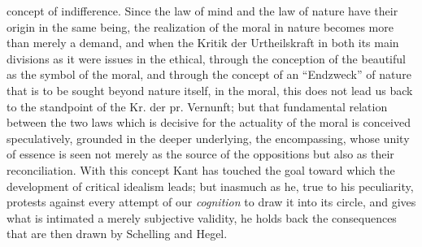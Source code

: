 concept of indifference. Since the law of mind and the law of nature
have their origin in the same being, the realization of the moral in
nature becomes more than merely a demand, and when the Kritik der
Urtheilskraft in both its main divisions as it were issues in the
ethical, through the conception of the beautiful as the symbol of the
moral, and through the concept of an ``Endzweck'' of nature that is to
be sought beyond nature itself, in the moral, this does not
lead us back to the standpoint of the Kr. der pr. Vernunft; but that
fundamental relation between the two laws which is decisive for the
actuality of the moral is conceived speculatively, grounded in the
deeper underlying, the encompassing, whose unity of essence is seen not
merely as the source of the oppositions but also as their
reconciliation. With this concept Kant has touched the goal toward
which the development of critical idealism leads; but inasmuch as he,
true to his peculiarity, protests against every attempt of our
\emph{cognition} to draw it into its circle, and gives what is
intimated a merely subjective validity, he holds back the consequences
that are then drawn by Schelling and Hegel.

\divrule

